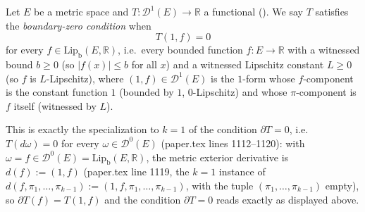 \begin{definition}[Boundary-zero condition $\partial T = 0$]
  Let $E$ be a metric space and $T \colon \mathcal{D}^1(E) \to \mathbb{R}$ a functional
  (). We say $T$ satisfies the \emph{boundary-zero condition} when
  \[
    T(1,f) = 0
  \]
  for every $f \in \operatorname{Lip_b}(E,\mathbb{R})$, i.e.\ every bounded function
  $f\colon E \to \mathbb{R}$ with a witnessed bound $b \ge 0$ (so $|f(x)| \le b$ for all $x$) and a
  witnessed Lipschitz constant $L \ge 0$ (so $f$ is $L$-Lipschitz), where $(1,f) \in
  \mathcal{D}^1(E)$ is the $1$-form whose $f$-component is the constant function $1$ (bounded by
  $1$, $0$-Lipschitz) and whose $\pi$-component is $f$ itself (witnessed by $L$).

  This is exactly the specialization to $k=1$ of the condition $\partial T = 0$, i.e.\
  $T(d\omega)=0$ for every $\omega \in \mathcal{D}^0(E)$ (paper.tex lines 1112--1120): with
  $\omega = f \in \mathcal{D}^0(E) = \operatorname{Lip_b}(E,\mathbb{R})$, the metric exterior
  derivative is $d(f) := (1,f)$ (paper.tex line 1119, the $k=1$ instance of
  $d(f,\pi_1,\dotsc,\pi_{k-1}) := (1,f,\pi_1,\dotsc,\pi_{k-1})$, with the tuple
  $(\pi_1,\dotsc,\pi_{k-1})$ empty), so $\partial T(f) = T(1,f)$ and the condition
  $\partial T = 0$ reads exactly as displayed above.
\end{definition}
